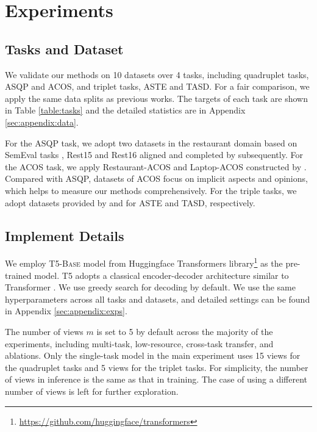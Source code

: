 \documentclass[11pt]{article}
\begin{document}
 
 
 
 
\section{Experiments}
\label{sec:exps}

\subsection{Tasks and Dataset}
We validate our methods on 10 datasets over 4 tasks, including quadruplet tasks, ASQP and ACOS, and triplet tasks, ASTE and TASD. For a fair comparison, we apply the same data splits as previous works. The targets of each task are shown in Table \ref{table:tasks} and the detailed statistics are in Appendix \ref{sec:appendix:data}. 

For the ASQP task, we adopt two datasets in the restaurant domain based on SemEval tasks \cite{pontiki-etal-2015-semeval, pontiki-etal-2016-semeval}, Rest15 and Rest16 aligned and completed by \citet{zhang-etal-2021-aspect} subsequently. For the ACOS task, we apply Restaurant-ACOS and Laptop-ACOS constructed by \citet{cai-etal-2021-aspect}. Compared with ASQP, datasets of ACOS focus on implicit aspects and opinions, which helps to measure our methods comprehensively.
For the triple tasks, we adopt datasets provided by \citet{xu-etal-2020-position} and \citet{DBLP:conf/aaai/WanYDLQP20} for ASTE \cite{DBLP:conf/aaai/PengXBHLS20} and TASD, respectively.



\subsection{Implement Details}
We employ T5-\textsc{Base} model \cite{DBLP:journals/jmlr/RaffelSRLNMZLL20} from Huggingface Transformers library\footnote{\url{https://github.com/huggingface/transformers}}\cite{wolf-etal-2020-transformers} as the pre-trained model. T5 adopts a classical encoder-decoder architecture similar to Transformer \cite{DBLP:conf/nips/VaswaniSPUJGKP17}.
We use greedy search for decoding by default. We use the same hyperparameters across all tasks and datasets, and detailed settings can be found in Appendix \ref{sec:appendix:exps}.

The number of views $m$ is set to 5 by default across the majority of the experiments, including multi-task, low-resource, cross-task transfer, and ablations.
Only the single-task model in the main experiment uses 15 views for the quadruplet tasks and 5 views for the triplet tasks. For simplicity, the number of views in inference is the same as that in training. The case of using a different number of views is left for further exploration.
\end{document}
